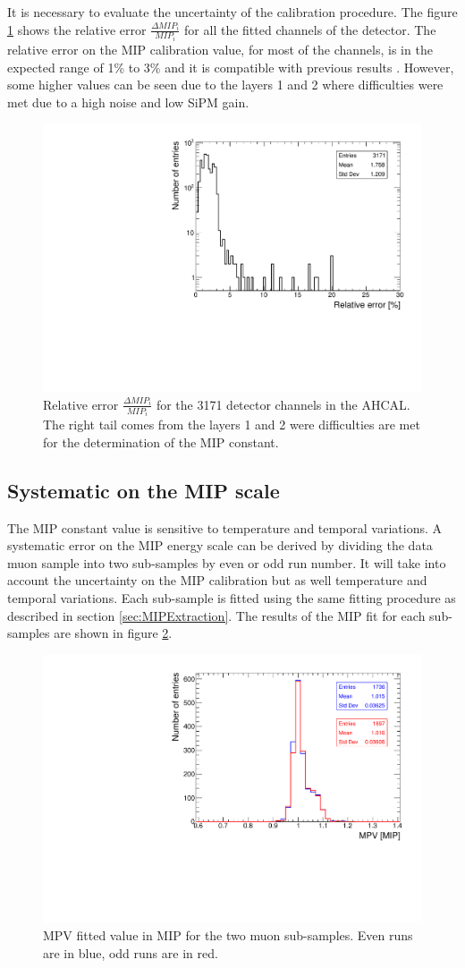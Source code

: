It is necessary to evaluate the uncertainty of the calibration procedure. The figure \ref{fig:MIPError} shows the relative error $\frac{\Delta MIP_i}{MIP_i}$ for all the fitted channels of the detector. The relative error on the MIP calibration value, for most of the channels, is in the expected range of 1\% to 3\% and it is compatible with previous results \cite{SarahMaster}. However, some higher values can be seen due to the layers 1 and 2 where difficulties were met due to a high noise and low SiPM gain.

\begin{figure}[htbp!]
	\centering
	\includegraphics[width=0.6\linewidth]{../Thesis_Plots/EnergyCalib/Plots/RelativeErrorMIP_Combined.pdf}
	\caption{Relative error $\frac{\Delta MIP_i}{MIP_i}$ for the 3171 detector channels in the AHCAL. The right tail comes from the layers 1 and 2 were difficulties are met for the determination of the MIP constant.} \label{fig:MIPError}
\end{figure}

\subsection{Systematic on the MIP scale}

The MIP constant value is sensitive to temperature and temporal variations. A systematic error on the MIP energy scale can be derived by dividing the data muon sample into two sub-samples by even or odd run number. It will take into account the uncertainty on the MIP calibration but as well temperature and temporal variations. Each sub-sample is fitted using the same fitting procedure as described in section \ref{sec:MIPExtraction}. The results of the MIP fit for each sub-samples are shown in figure \ref{fig:MIPSyst}.

\begin{figure}[htbp!]
	\centering
	\includegraphics[width=0.6\linewidth]{../Thesis_Plots/EnergyCalib/Plots/SystematicMIP.pdf}
	\caption{MPV fitted value in MIP for the two muon sub-samples. Even runs are in blue, odd runs are in red.} \label{fig:MIPSyst}
\end{figure}

